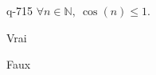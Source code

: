 \begin{truefalse}{q-715}
$\forall n \in \mathbb N,\: \cos(n)\leq 1$.
\item* Vrai
\item Faux
\end{truefalse}

